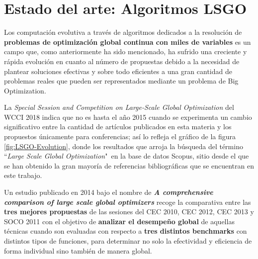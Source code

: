 \section{Estado del arte: Algoritmos LSGO} \label{cap:revisionLSGO}

Los computación evolutiva a través de algoritmos dedicados a la resolución de \textbf{problemas de optimización global continua con miles de variables} es un campo que, como anteriormente ha sido mencionado, ha sufrido una creciente y rápida evolución en cuanto al número de propuestas debido a la necesidad de plantear soluciones efectivas y sobre todo eficientes a una gran cantidad de problemas reales que pueden ser representados mediante un problema de Big Optimization.

La \textit{Special Session and Competition on Large-Scale Global Optimization} del WCCI 2018\cite{WCCI-SHADEILS} indica que no es hasta el año 2015 cuando se experimenta un cambio significativo entre la cantidad de artículos publicados en esta materia y los propuestos únicamente para conferencias; así lo refleja el gráfico de la figura \ref{fig:LSGO-Evolution}, donde los resultados que arroja la búsqueda del término ``\textit{Large Scale Global Optimization}"\ en la base de datos Scopus\cite{SCOPUS}, sitio desde el que se han obtenido la gran mayoría de referencias bibliográficas que se encuentran en este trabajo.

Un estudio publicado en 2014 bajo el nombre de \textbf{\textit{A comprehensive comparison of large scale global optimizers}}\cite{ComprehensiveComparison} recoge la comparativa entre las \textbf{tres mejores propuestas} de las sesiones del CEC 2010, CEC 2012, CEC 2013 y SOCO 2011 con el objetivo de \textbf{analizar el desempeño global} de aquellas técnicas cuando son evaluadas con respecto a\textbf{ tres distintos benchmarks} con distintos tipos de funciones, para determinar no solo la efectividad y eficiencia de forma individual sino también de manera global.

